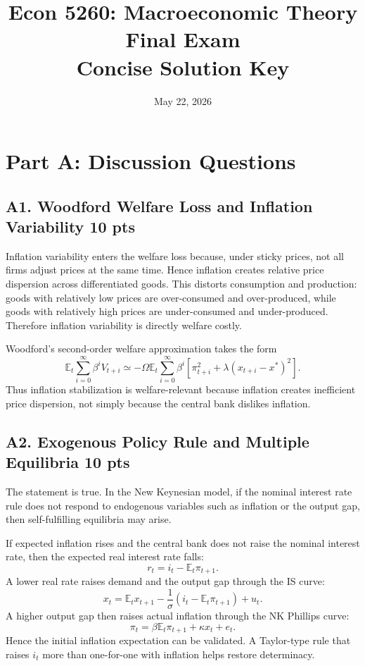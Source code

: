 \documentclass[11pt]{article}
\title{Econ 5260: Macroeconomic Theory Final Exam\\Concise Solution Key}
\author{}
\date{May 22, 2026}
\begin{document}
\maketitle

\section*{Part A: Discussion Questions}

\subsection*{A1. Woodford Welfare Loss and Inflation Variability \hfill 10 pts}

Inflation variability enters the welfare loss because, under sticky prices, not all firms adjust prices at the same time. Hence inflation creates relative price dispersion across differentiated goods. This distorts consumption and production: goods with relatively low prices are over-consumed and over-produced, while goods with relatively high prices are under-consumed and under-produced. Therefore inflation variability is directly welfare costly.

Woodford's second-order welfare approximation takes the form
\[
\mathbb{E}_t\sum_{i=0}^{\infty}\beta^i V_{t+i}
\simeq
-\Omega \mathbb{E}_t\sum_{i=0}^{\infty}\beta^i
\left[
\pi_{t+i}^2+\lambda (x_{t+i}-x^*)^2
\right].
\]
Thus inflation stabilization is welfare-relevant because inflation creates inefficient price dispersion, not simply because the central bank dislikes inflation.

\subsection*{A2. Exogenous Policy Rule and Multiple Equilibria \hfill 10 pts}

The statement is true. In the New Keynesian model, if the nominal interest rate rule does not respond to endogenous variables such as inflation or the output gap, then self-fulfilling equilibria may arise.

If expected inflation rises and the central bank does not raise the nominal interest rate, then the expected real interest rate falls:
\[
r_t=i_t-\mathbb{E}_t\pi_{t+1}.
\]
A lower real rate raises demand and the output gap through the IS curve:
\[
x_t=\mathbb{E}_tx_{t+1}-\frac{1}{\sigma}(i_t-\mathbb{E}_t\pi_{t+1})+u_t.
\]
A higher output gap then raises actual inflation through the NK Phillips curve:
\[
\pi_t=\beta \mathbb{E}_t\pi_{t+1}+\kappa x_t+e_t.
\]
Hence the initial inflation expectation can be validated. A Taylor-type rule that raises \(i_t\) more than one-for-one with inflation helps restore determinacy.
\end{document}
